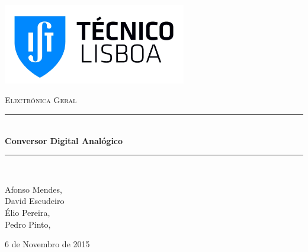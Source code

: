 \documentclass[a4paper,11pt]{report}
\newcommand{\HRule}{\rule{\linewidth}{0.5mm}}
\begin{document}
	
 
\begin{titlepage}

	\begin{flushleft}
	\includegraphics[width=0.6\textwidth]{./logo}~\\[4cm]
	\end{flushleft}

\begin{center}
\begin{spacing}{2}

	\textsc{\LARGE Electrónica Geral}\\[1cm]

\HRule \\[0.4cm]
{ \huge \bfseries Conversor Digital Analógico}\\[0.4cm]

\HRule \\[1.5cm]

\end{spacing}

	\vspace{2cm}

	Afonso Mendes, \\
	David Escudeiro \\
	Élio Pereira, \\
	Pedro Pinto, \\
	\vspace{4cm}


\vfill

{\large 6 de Novembro de 2015}
\end{center}
\end{titlepage} 





\tableofcontents %
\setcounter{page}{1} %
\end{document}
